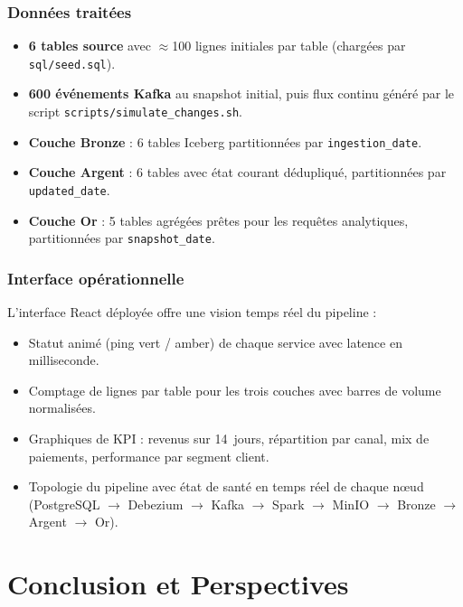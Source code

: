 \documentclass[12pt,a4paper]{report}
\begin{document}
\subsection{Données traitées}

\begin{itemize}
    \item \textbf{6 tables source} avec $\approx$100 lignes initiales par table
          (chargées par \texttt{sql/seed.sql}).
    \item \textbf{600 événements Kafka} au snapshot initial, puis flux continu
          généré par le script \texttt{scripts/simulate\_changes.sh}.
    \item \textbf{Couche Bronze} : 6 tables Iceberg partitionnées par
          \texttt{ingestion\_date}.
    \item \textbf{Couche Argent} : 6 tables avec état courant dédupliqué,
          partitionnées par \texttt{updated\_date}.
    \item \textbf{Couche Or} : 5 tables agrégées prêtes pour les requêtes
          analytiques, partitionnées par \texttt{snapshot\_date}.
\end{itemize}

\subsection{Interface opérationnelle}

L'interface React déployée offre une vision temps réel du pipeline :
\begin{itemize}
    \item Statut animé (ping vert / amber) de chaque service avec latence
          en milliseconde.
    \item Comptage de lignes par table pour les trois couches avec barres
          de volume normalisées.
    \item Graphiques de KPI : revenus sur 14~jours, répartition par canal,
          mix de paiements, performance par segment client.
    \item Topologie du pipeline avec état de santé en temps réel de chaque
          nœud (PostgreSQL $\to$ Debezium $\to$ Kafka $\to$ Spark $\to$
          MinIO $\to$ Bronze $\to$ Argent $\to$ Or).
\end{itemize}

\chapter{Conclusion et Perspectives}
\end{document}

